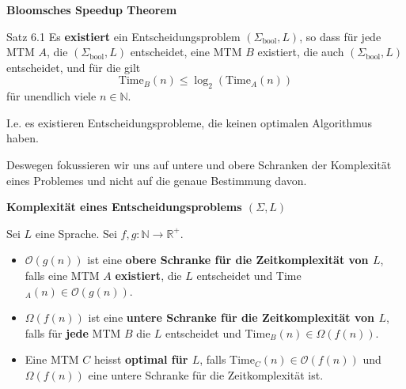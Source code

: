 \documentclass[a4paper, 11pt]{article}
\def\R{\mathbb{R}}
\def\N{\mathbb{N}}
\def\O{\mathcal{O}}
\newcommand\myTitle[1]{{\large \textbf {#1}}}
\begin{document}
                            \myTitle{Bloomsches Speedup Theorem}
                            \begin{mainbox}{Satz 6.1}
                                Es \textbf{existiert} ein Entscheidungsproblem $(\Sigma_{\text{bool}}, L)$, 
                                so dass für jede MTM $A$, die $(\Sigma_{\text{bool}}, L)$ entscheidet, 
                                eine MTM $B$ existiert, die auch $(\Sigma_{\text{bool}}, L)$ entscheidet, und für die gilt
                                $$\text{Time}_B(n)\leq \log_2(\text{Time}_A(n))$$
                                für unendlich viele $n \in \N$.
                            \end{mainbox}
                            
                            I.e. es existieren Entscheidungsprobleme, die keinen optimalen Algorithmus haben.
                        
                            Deswegen fokussieren wir uns auf untere und obere Schranken der Komplexität eines Problemes und nicht auf die genaue Bestimmung davon.
                        
                            \myTitle{Komplexität eines Entscheidungsproblems $(\Sigma, L)$}
                            \begin{mainbox}{}
                                Sei $L$ eine Sprache. Sei $f, g: \N \to \R^+$.
                                \begin{itemize}[label=$\blacktriangleright$]
                                    
                                    \item $\O(g(n))$ ist eine \textbf{obere Schranke für die Zeitkomplexität von $L$}, falls eine MTM $A$ \textbf{existiert}, die $L$ entscheidet und Time$_A(n) \in \O(g(n))$.
                                    
                                    \item $\Omega(f(n))$ ist eine \textbf{untere Schranke für die Zeitkomplexität von $L$}, falls für \textbf{jede} MTM $B$ die $L$ entscheidet und Time$_B(n) \in \Omega(f(n))$.
                                    
                                    \item Eine MTM $C$ heisst \textbf{optimal für $L$}, falls Time$_C(n) \in \O(f(n))$ und $\Omega(f(n))$ eine untere Schranke für die Zeitkomplexität ist. 
                                \end{itemize}
                            \end{mainbox}
                            
\end{document}
